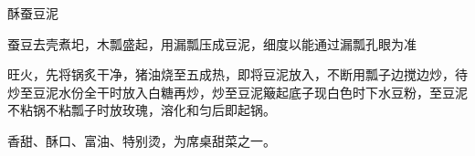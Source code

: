 \begin{recipe}{酥蚕豆泥}

\ingredients


\cooking

\step 蚕豆去壳煮圯，木瓢盛起，用漏瓢压成豆泥，细度以能通过漏瓢孔眼为准

\step 旺火，先将锅炙干净，猪油烧至五成热，即将豆泥放入，不断用瓢子边搅边炒，待炒至豆泥水份全干时放入白糖再炒，炒至豆泥簸起底子现白色时下水豆粉，至豆泥不粘锅不粘瓢子时放玫瑰，溶化和匀后即起锅。

\notes

香甜、酥口、富油、特别烫，为席桌甜菜之一。

\end{recipe}


